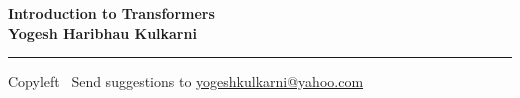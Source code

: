 
\graphicspath{{images/}}

\footnotesize


\begin{center}
\Large{\textbf{Introduction to Transformers\\ Yogesh Haribhau Kulkarni}}  
\end{center}

\begin{multicols}{2}

\end{multicols}

\rule{\linewidth}{0.25pt}
\scriptsize
Copyleft \textcopyleft\  Send suggestions to 
\href{http://www.yogeshkulkarni.com}{yogeshkulkarni@yahoo.com}


